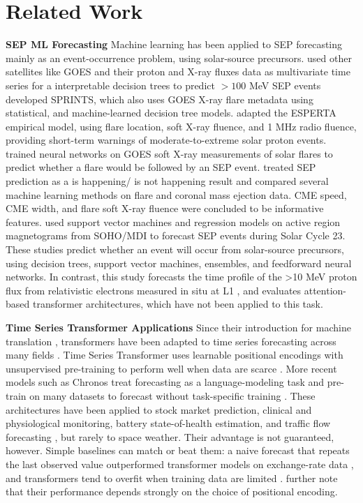 \section{Related Work}
\label{sec:relatedwork}

\textbf{SEP ML Forecasting}
Machine learning has been applied to SEP forecasting mainly as an event-occurrence problem, using solar-source precursors.
 used other satellites  like GOES and their proton and X-ray fluxes data as multivariate time series for a  interpretable decision trees to predict $>100$ MeV SEP events
 developed SPRINTS, which also uses GOES X-ray flare metadata using statistical, and machine-learned decision tree models.
 adapted the ESPERTA empirical model, using flare location, soft X-ray fluence, and 1 MHz radio fluence, providing short-term warnings of moderate-to-extreme solar proton events.
 trained neural networks on GOES soft X-ray measurements of solar flares to predict whether a flare would be followed by an SEP event.
 treated SEP prediction as a is happening/ is not happening result and compared several machine learning methods on flare and coronal mass ejection data. CME speed,
CME width, and flare soft X-ray fluence were concluded to be informative features.  used support vector machines and regression models on active region magnetograms from SOHO/MDI
to forecast SEP events during Solar Cycle 23. These studies predict whether an event will occur from solar-source precursors, using decision trees, support vector machines,
ensembles, and feedforward neural networks. In contrast, this study forecasts the time profile of the >10 MeV proton flux from relativistic electrons measured in situ at L1
\cite{posner2007forecasting,torres2025machine},
and evaluates attention-based transformer architectures, which have not been applied to this task.

\textbf{Time Series Transformer Applications}
Since their introduction for machine translation \cite{vaswani2017attention}, transformers have been adapted to time series forecasting across many fields \cite{zhao2026transformersurvey}.
Time Series Transformer uses learnable positional encodings with unsupervised pre-training to perform well when data are scarce \cite{zerveas2020transformer}.
More recent models such as Chronos treat forecasting as a language-modeling task and pre-train on many datasets to forecast without task-specific training \cite{ansari2024chronos}.
These architectures have been applied to stock market prediction, clinical and physiological monitoring, battery state-of-health estimation,
and traffic flow forecasting \cite{cai2020traffictransformer,zhao2026transformersurvey}, but rarely to space weather.
Their advantage is not guaranteed, however. Simple baselines can match or beat them: a naive forecast that
repeats the last observed value outperformed transformer models on exchange-rate data \cite{zeng2022transformers},
and transformers tend to overfit when training data are limited \cite{zhao2026transformersurvey}.
 further note that their performance depends strongly on the choice of positional encoding.
